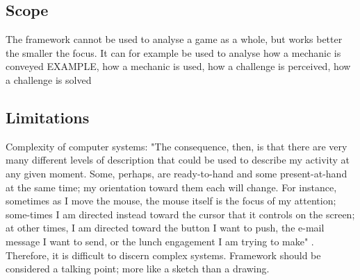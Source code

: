 \subsection{Scope}
The framework cannot be used to analyse a game as a whole, but works better the smaller the focus. It can for example be used to analyse how a mechanic is conveyed EXAMPLE, how a mechanic is used, how a challenge is perceived, how a challenge is solved

\subsection{Limitations}
Complexity of computer systems: "The consequence, then, is that there are very many different levels of description that could be used to describe my activity at any given moment. Some, perhaps, are ready-to-hand and some present-at-hand at the same time; my orientation toward them each will change. For instance, sometimes as I move the mouse, the mouse itself is the focus of my attention; some-times I am directed instead toward the cursor that it controls on the screen; at other times, I am directed toward the button I want to push, the e-mail message I want to send, or the lunch engagement I am trying to make" \cite[p. 140]{dourish}. Therefore, it is difficult to discern complex systems. Framework should be considered a talking point; more like a sketch than a drawing.
